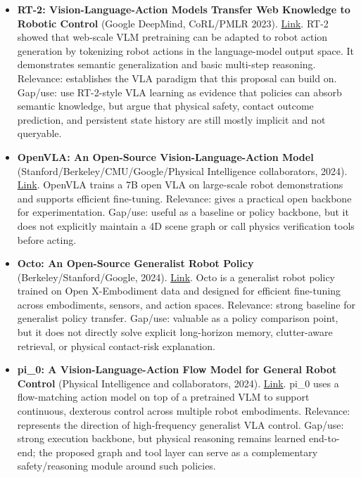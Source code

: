 \begin{itemize}
\item \textbf{RT-2: Vision-Language-Action Models Transfer Web Knowledge to Robotic Control} (Google DeepMind, CoRL/PMLR 2023). \href{https://arxiv.org/abs/2307.15818}{Link}. RT-2 showed that web-scale VLM pretraining can be adapted to robot action generation by tokenizing robot actions in the language-model output space. It demonstrates semantic generalization and basic multi-step reasoning. Relevance: establishes the VLA paradigm that this proposal can build on. Gap/use: use RT-2-style VLA learning as evidence that policies can absorb semantic knowledge, but argue that physical safety, contact outcome prediction, and persistent state history are still mostly implicit and not queryable.

\item \textbf{OpenVLA: An Open-Source Vision-Language-Action Model} (Stanford/Berkeley/CMU/Google/Physical Intelligence collaborators, 2024). \href{https://arxiv.org/abs/2406.09246}{Link}. OpenVLA trains a 7B open VLA on large-scale robot demonstrations and supports efficient fine-tuning. Relevance: gives a practical open backbone for experimentation. Gap/use: useful as a baseline or policy backbone, but it does not explicitly maintain a 4D scene graph or call physics verification tools before acting.

\item \textbf{Octo: An Open-Source Generalist Robot Policy} (Berkeley/Stanford/Google, 2024). \href{https://arxiv.org/abs/2405.12213}{Link}. Octo is a generalist robot policy trained on Open X-Embodiment data and designed for efficient fine-tuning across embodiments, sensors, and action spaces. Relevance: strong baseline for generalist policy transfer. Gap/use: valuable as a policy comparison point, but it does not directly solve explicit long-horizon memory, clutter-aware retrieval, or physical contact-risk explanation.

\item \textbf{pi\_0: A Vision-Language-Action Flow Model for General Robot Control} (Physical Intelligence and collaborators, 2024). \href{https://arxiv.org/abs/2410.24164}{Link}. pi\_0 uses a flow-matching action model on top of a pretrained VLM to support continuous, dexterous control across multiple robot embodiments. Relevance: represents the direction of high-frequency generalist VLA control. Gap/use: strong execution backbone, but physical reasoning remains learned end-to-end; the proposed graph and tool layer can serve as a complementary safety/reasoning module around such policies.
\end{itemize}

